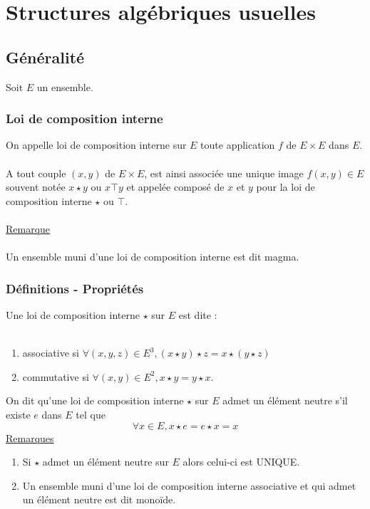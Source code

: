\chapter{Structures algébriques usuelles}

\minitoc

\section{Généralité}
Soit \(E\) un ensemble.
\subsection{Loi de composition interne}
\begin{defprop}
    On appelle loi de composition interne sur \(E\) toute application \(f\) de \(E \times E\) dans \(E\).\\~\\
    A tout couple \((x, y)\) de \(E \times E\), est ainsi associée une unique image \(f (x, y) \in E\) souvent notée \(x \star y\) ou \(x\top y\) et appelée composé de \(x\) et \(y\) pour la loi de composition interne \(\star\) ou \(\top\).\\~\\
    \underline{Remarque}\\~\\
    Un ensemble muni d’une loi de composition interne est dit magma.
\end{defprop}

\subsection{Définitions - Propriétés}

\begin{defprop}
    Une loi de composition interne \(\star\) sur \(E\) est dite :\\~\\
    \begin{enumerate}
        \item associative si \(\forall (x, y, z) \in E^3, (x \star y) \star z = x \star (y \star z)\)
        \item commutative si \(\forall (x, y) \in E^2, x \star y = y \star x\).
    \end{enumerate}
\end{defprop}

\begin{defprop}
    On dit qu’une loi de composition interne \(\star\) sur \(E\) admet un élément neutre s’il existe \(e\) dans \(E\) tel que
    \[\forall x \in E, x \star e = e \star x = x\]
    \underline{Remarques}
    \begin{enumerate}
        \item Si \(\star\) admet un élément neutre sur \(E\) alors celui-ci est UNIQUE.\\
        \item Un ensemble muni d’une loi de composition interne associative et qui admet un élément neutre est dit monoïde.
    \end{enumerate}
\end{defprop}

